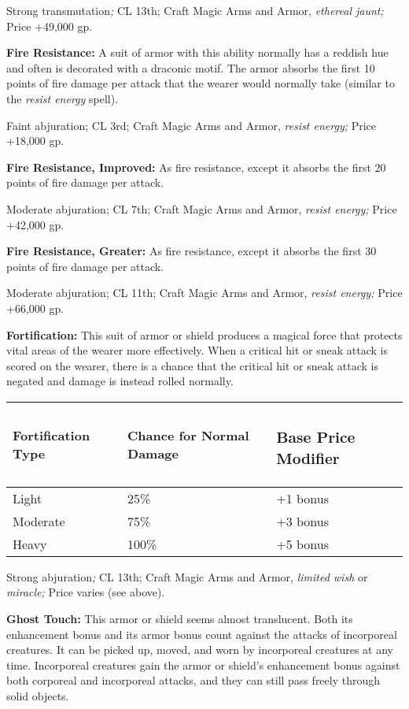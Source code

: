 \documentclass{article}
\begin{document}
Strong transmutation\textit{; }CL 13th; Craft Magic Arms and Armor, \textit{ethereal 
jaunt; }Price +49,000 gp.

\textbf{Fire Resistance:} A suit of armor with this ability normally has a reddish 
hue and often is decorated with a draconic motif. The armor absorbs the first 10 
points of fire damage per attack that the wearer would normally take (similar to 
the \textit{resist energy }spell).

Faint abjuration; CL 3rd; Craft Magic Arms and Armor, \textit{resist energy; }Price 
+18,000 gp.

\textbf{Fire Resistance, Improved: }As fire resistance, except it absorbs the first 
20 points of fire damage per attack.

Moderate abjuration; CL 7th; Craft Magic Arms and Armor, \textit{resist energy; 
}Price +42,000 gp.

\textbf{Fire Resistance, Greater:} As fire resistance, except it absorbs the first 
30 points of fire damage per attack.

Moderate abjuration; CL 11th; Craft Magic Arms and Armor, \textit{resist energy; 
}Price +66,000 gp.

\textbf{Fortification: }This suit of armor or shield produces a magical force that 
protects vital areas of the wearer more effectively. When a critical hit or sneak 
attack is scored on the wearer, there is a chance that the critical hit or sneak 
attack is negated and damage is instead rolled normally.

\begin{tabular}{|>{\raggedright}p{76pt}|>{\raggedright}p{119pt}|>{\raggedright}p{83pt}|}
\hline
F\textbf{ortification Type} & C\textbf{hance for Normal Damage} & \subsubsection*{B\textbf{ase 
Price Modifier}}\tabularnewline
\hline
Light & 25\% & +1 bonus\tabularnewline
\hline
Moderate & 75\% & +3 bonus\tabularnewline
\hline
Heavy & 100\% & +5 bonus\tabularnewline
\hline
\end{tabular}

Strong abjuration\textit{; }CL 13th; Craft Magic Arms and Armor, \textit{limited 
wish }or \textit{miracle; }Price varies (see above).

\textbf{Ghost Touch:} This armor or shield seems almost translucent. Both its enhancement 
bonus and its armor bonus count against the attacks of incorporeal creatures. It 
can be picked up, moved, and worn by incorporeal creatures at any time. Incorporeal 
creatures gain the armor or shield's enhancement bonus against both corporeal and 
incorporeal attacks, and they can still pass freely through solid objects.
\end{document}
